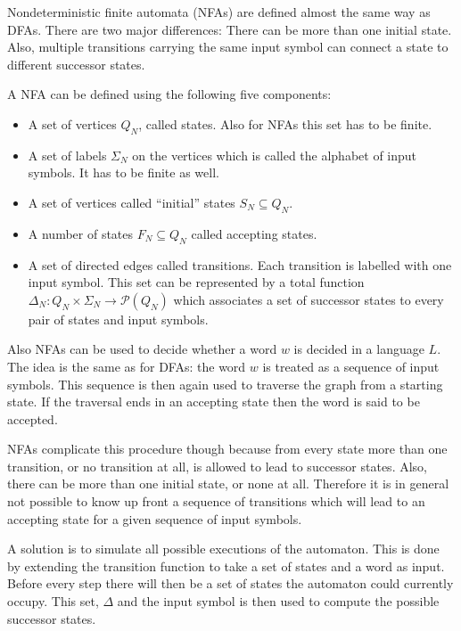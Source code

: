 Nondeterministic finite automata (NFAs) are defined almost the same way as DFAs.
There are two major differences: There can be more than one initial state.
Also, multiple transitions carrying the same input symbol can connect a state to different
successor states.

\begin{definition}
    A NFA can be defined using the following five components:

    \begin{itemize}
        \item A set of vertices $Q_N$, called states.
        Also for NFAs this set has to be finite.
        \item A set of labels $\Sigma_N$ on the vertices which is called the alphabet of input symbols.
        It has to be finite as well.
        \item A set of vertices called ``initial'' states $S_N \subseteq Q_N$.
        \item A number of states $F_N \subseteq Q_N$ called accepting states.
        \item A set of directed edges called transitions.
        Each transition is labelled with one input symbol.
        This set can be represented by a total function
        $\Delta_N : Q_N \times \Sigma_N \rightarrow \mathcal{P}(Q_N)$ which
        associates a set of successor states to every pair of states and input symbols.
    \end{itemize}
\end{definition}

Also NFAs can be used to decide whether a word $w$ is decided in a language $L$.
The idea is the same as for DFAs: the word $w$ is treated as a sequence of input symbols.
This sequence is then again used to traverse the graph from a starting state.
If the traversal ends in an accepting state then the word is said to be accepted.

NFAs complicate this procedure though because from every state more than one
transition, or no transition at all, is allowed to lead to successor states.
Also, there can be more than one initial state, or none at all.
Therefore it is in general not possible to know up front
a sequence of transitions which will lead to an accepting state
for a given sequence of input symbols.

A solution is to simulate all possible executions of the automaton.
This is done by extending the transition function to take
a set of states and a word as input.
Before every step there will then be a set of states the automaton
could currently occupy.
This set, $\Delta$ and the input symbol is then used to compute the possible successor states.

